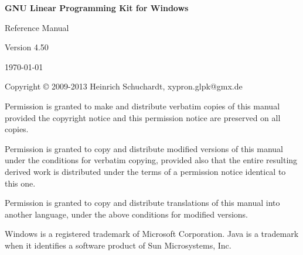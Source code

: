\documentclass[a4paper,11pt]{report}
\begin{document}
\thispagestyle{empty}

\begin{center}

\vspace*{1in}

\begin{huge}
\sf\bfseries GNU Linear Programming Kit\linebreak
for Windows
\end{huge}

\vspace{0.5in}

\begin{LARGE}
\sf Reference Manual
\end{LARGE}

\vspace{0.5in}

\begin{LARGE}
\sf Version 4.50
\end{LARGE}

\vspace{0.5in}
\begin{Large}
\sf \today
\end{Large}
\end{center}

\newpage

\vspace*{1in}

\vfill

\medskip \noindent
Copyright \copyright{} 2009-2013 Heinrich Schuchardt, xypron.glpk@gmx.de

\medskip \noindent
Permission is granted to make and distribute verbatim copies of this
manual provided the copyright notice and this permission notice are
preserved on all copies.

\medskip \noindent
Permission is granted to copy and distribute modified versions of this
manual under the conditions for verbatim copying, provided also that the
entire resulting derived work is distributed under the terms of
a permission notice identical to this one.

\medskip \noindent
Permission is granted to copy and distribute translations of this manual
into another language, under the above conditions for modified versions.

\medskip \noindent
Windows is a registered trademark of Microsoft Corporation. Java is a 
trademark when it identifies a software product of Sun Microsystems, Inc.

\tableofcontents
\end{document}
